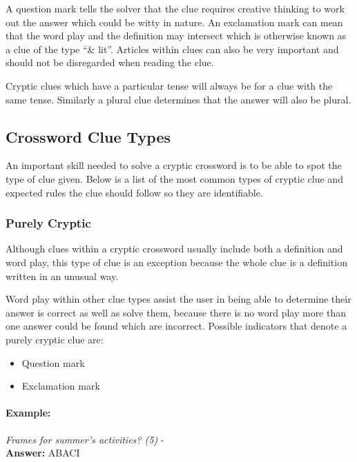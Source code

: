 A question mark tells the solver that the clue requires creative thinking to
work out the answer which could be witty in nature. An exclamation mark can mean
that the word play and the definition may intersect which is otherwise known as
a clue of the type ``\& lit''. Articles within clues can also be very important
and should not be disregarded when reading the clue.

Cryptic clues which have a particular tense will always be for a clue with the
same tense. Similarly a plural clue determines that the answer will also be
plural.


\subsection{Crossword Clue Types}

An important skill needed to solve a cryptic crossword is to be able to spot the
type of clue given. Below is a list of the most common types of cryptic clue and
expected rules the clue should follow so they are identifiable. 


\subsubsection{Purely Cryptic}

Although clues within a cryptic crossword usually include both a definition and
word play, this type of clue is an exception because the whole clue is a
definition written in an unusual way.

Word play within other clue types assist the user in being able to determine
their answer is correct as well as solve them, because there is no word play
more than one answer could be found which are incorrect. Possible indicators
that denote a purely cryptic clue are:

\begin{itemize} 
  \item Question mark 
  \item Exclamation mark
\end{itemize} 

\paragraph{Example:} \emph{Frames for summer's activities? (5)} - \citep{shuchiCryptic08} \\
\textbf{Answer:} ABACI 

